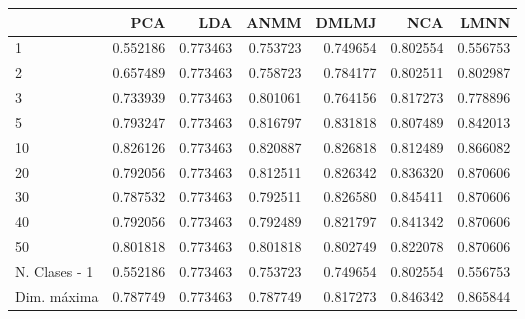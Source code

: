 \begin{tabular}{lrrrrrr}
\toprule
{} &       PCA &       LDA &      ANMM &     DMLMJ &       NCA &      LMNN \\
\midrule
1             &  0.552186 &  0.773463 &  0.753723 &  0.749654 &  0.802554 &  0.556753 \\
2             &  0.657489 &  0.773463 &  0.758723 &  0.784177 &  0.802511 &  0.802987 \\
3             &  0.733939 &  0.773463 &  0.801061 &  0.764156 &  0.817273 &  0.778896 \\
5             &  0.793247 &  0.773463 &  0.816797 &  0.831818 &  0.807489 &  0.842013 \\
10            &  0.826126 &  0.773463 &  0.820887 &  0.826818 &  0.812489 &  0.866082 \\
20            &  0.792056 &  0.773463 &  0.812511 &  0.826342 &  0.836320 &  0.870606 \\
30            &  0.787532 &  0.773463 &  0.792511 &  0.826580 &  0.845411 &  0.870606 \\
40            &  0.792056 &  0.773463 &  0.792489 &  0.821797 &  0.841342 &  0.870606 \\
50            &  0.801818 &  0.773463 &  0.801818 &  0.802749 &  0.822078 &  0.870606 \\
N. Clases - 1 &  0.552186 &  0.773463 &  0.753723 &  0.749654 &  0.802554 &  0.556753 \\
Dim. máxima   &  0.787749 &  0.773463 &  0.787749 &  0.817273 &  0.846342 &  0.865844 \\
\bottomrule
\end{tabular}

